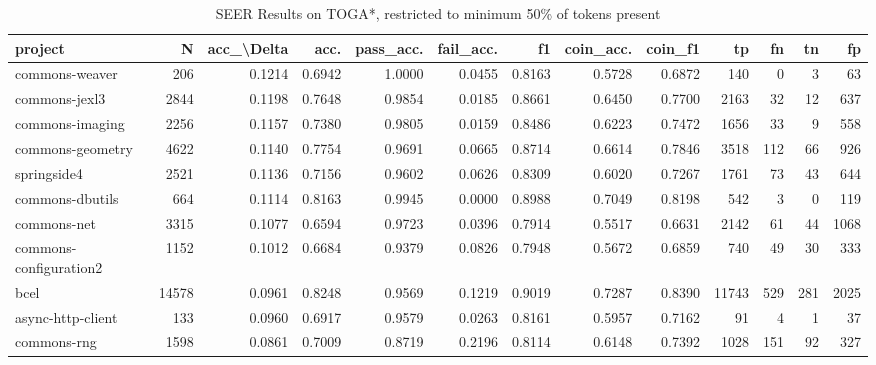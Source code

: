 \begin{table}
\centering
\caption{SEER Results on TOGA*, restricted to minimum 50\% of tokens present}
\label{tab:toga_results_50}
\begin{tabular}{lrrrrrrrrrrrr}
\toprule
                project &       N &  acc\_\textbackslash Delta &    acc. &  pass\_acc. &  fail\_acc. &      f1 &  coin\_acc. &  coin\_f1 &      tp &    fn &    tn &     fp \\
\midrule
         commons-weaver &     206 &      0.1214 &  0.6942 &     1.0000 &     0.0455 &  0.8163 &     0.5728 &   0.6872 &     140 &     0 &     3 &     63 \\
          commons-jexl3 &    2844 &      0.1198 &  0.7648 &     0.9854 &     0.0185 &  0.8661 &     0.6450 &   0.7700 &    2163 &    32 &    12 &    637 \\
        commons-imaging &    2256 &      0.1157 &  0.7380 &     0.9805 &     0.0159 &  0.8486 &     0.6223 &   0.7472 &    1656 &    33 &     9 &    558 \\
       commons-geometry &    4622 &      0.1140 &  0.7754 &     0.9691 &     0.0665 &  0.8714 &     0.6614 &   0.7846 &    3518 &   112 &    66 &    926 \\
            springside4 &    2521 &      0.1136 &  0.7156 &     0.9602 &     0.0626 &  0.8309 &     0.6020 &   0.7267 &    1761 &    73 &    43 &    644 \\
        commons-dbutils &     664 &      0.1114 &  0.8163 &     0.9945 &     0.0000 &  0.8988 &     0.7049 &   0.8198 &     542 &     3 &     0 &    119 \\
            commons-net &    3315 &      0.1077 &  0.6594 &     0.9723 &     0.0396 &  0.7914 &     0.5517 &   0.6631 &    2142 &    61 &    44 &   1068 \\
 commons-configuration2 &    1152 &      0.1012 &  0.6684 &     0.9379 &     0.0826 &  0.7948 &     0.5672 &   0.6859 &     740 &    49 &    30 &    333 \\
                   bcel &   14578 &      0.0961 &  0.8248 &     0.9569 &     0.1219 &  0.9019 &     0.7287 &   0.8390 &   11743 &   529 &   281 &   2025 \\
      async-http-client &     133 &      0.0960 &  0.6917 &     0.9579 &     0.0263 &  0.8161 &     0.5957 &   0.7162 &      91 &     4 &     1 &     37 \\
            commons-rng &    1598 &      0.0861 &  0.7009 &     0.8719 &     0.2196 &  0.8114 &     0.6148 &   0.7392 &    1028 &   151 &    92 &    327 \\

\end{tabular}
\end{table}
